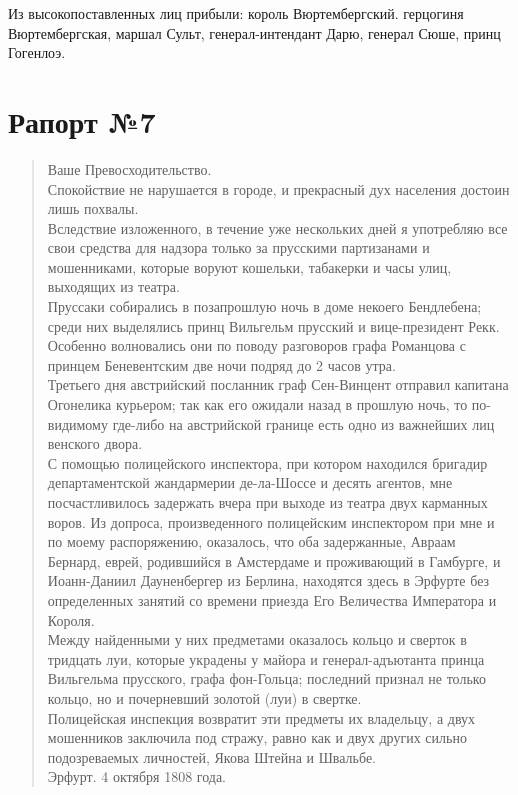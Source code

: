 \documentclass[
  oneside,
  12pt,
  titlepage]{book}
\begin{document}
Из высокопоставленных лиц прибыли: король Вюртембергский. герцогиня Вюртембергская, маршал Сульт, генерал-интендант Дарю, генерал Сюше, принц Гогенлоэ.

\hypertarget{ux440ux430ux43fux43eux440ux442-7}{%
\section{Рапорт №7}\label{ux440ux430ux43fux43eux440ux442-7}}

\begin{quote}
Ваше Превосходительство.\\
Спокойствие не нарушается в городе, и прекрасный дух населения достоин лишь похвалы.\\
Вследствие изложенного, в течение уже нескольких дней я употребляю все свои средства для надзора только за прусскими партизанами и мошенниками, которые воруют кошельки, табакерки и часы улиц, выходящих из театра.\\
Пруссаки собирались в позапрошлую ночь в доме некоего Бендлебена; среди них выделялись принц Вильгельм прусский и вице-президент Рекк.\\
Особенно волновались они по поводу разговоров графа Романцова с принцем Беневентским две ночи подряд до 2 часов утра.\\
Третьего дня австрийский посланник граф Сен-Винцент отправил капитана Огонелика курьером; так как его ожидали назад в прошлую ночь, то по-видимому где-либо на австрийской границе есть одно из важнейших лиц венского двора.\\
С помощью полицейского инспектора, при котором находился бригадир департаментской жандармерии де-ла-Шоссе и десять агентов, мне посчастливилось задержать вчера при выходе из театра двух карманных воров. Из допроса, произведенного полицейским инспектором при мне и по моему распоряжению, оказалось, что оба задержанные, Авраам Бернард, еврей, родившийся в Амстердаме и проживающий в Гамбурге, и Иоанн-Даниил Дауненбергер из Берлина, находятся здесь в Эрфурте без определенных занятий со времени приезда Его Величества Императора и Короля.\\
Между найденными у них предметами оказалось кольцо и сверток в тридцать луи, которые украдены у майора и генерал-адъютанта принца Вильгельма прусского, графа фон-Гольца; последний признал не только кольцо, но и почерневший золотой (луи) в свертке.\\
Полицейская инспекция возвратит эти предметы их владельцу, а двух мошенников заключила под стражу, равно как и двух других сильно подозреваемых личностей, Якова Штейна и Швальбе.\\
Эрфурт. 4 октября 1808 года.
\end{quote}
\end{document}
